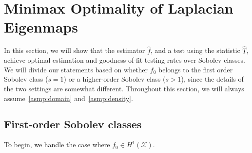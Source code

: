 \documentclass{article}
\newcommand{\1}{\mathbf{1}}
\newcommand{\mc}[1]{\mathcal{#1}}
\newcommand{\wh}[1]{\widehat{#1}}
\theoremstyle{alden}
\theoremstyle{aldenthm}
\theoremstyle{definition}
\theoremstyle{remark}
\begin{document}
\section{Minimax Optimality of Laplacian Eigenmaps}
\label{sec:minimax_optimal_laplacian_eigenmaps}

In this section, we will show that the estimator $\wh{f}$, and a test using the statistic $\wh{T}$, achieve optimal estimation and goodness-of-fit testing rates over Sobolev classes. We will divide our statements based on whether $f_0$ belongs to the first order Sobolev class ($s = 1$) or a higher-order Sobolev class ($s > 1$), since the details of the two settings are somewhat different. Throughout this section, we will always assume~\ref{asmp:domain} and~\ref{asmp:density}.

\subsection{First-order Sobolev classes}
\label{sec:first_order_sobolev_classes}
To begin, we handle the case where $f_0 \in H^1(\mc{X})$.
\end{document}
